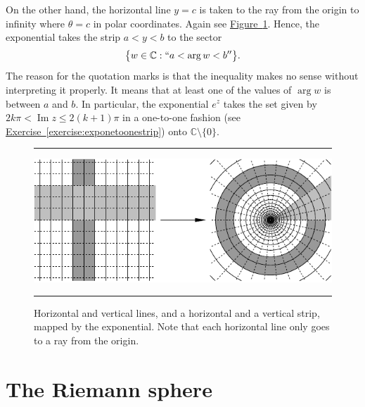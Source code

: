 \documentclass[12pt,openany]{book}
\renewcommand{\Im}{\operatorname{Im}}
\newcommand{\C}{{\mathbb{C}}}
\theoremstyle{plain}
\theoremstyle{remark}
\theoremstyle{definition}
\newenvironment{myfig}{%
\begin{figure}[h!t]
\noindent\rule{\textwidth}{0.5pt}\vspace{12pt}\par\centering}%
{\par\noindent\rule{\textwidth}{0.5pt}
\end{figure}}
\theoremstyle{exercise}
\theoremstyle{example}
\newcommand{\figureref}[1]{\hyperref[#1]{Figure~\ref*{#1}}}
\newcommand{\exerciseref}[1]{\hyperref[#1]{Exercise~\ref*{#1}}}
\begin{document}
On the other hand, the horizontal line $y=c$
is taken to the ray from the origin to infinity where $\theta = c$ in polar
coordinates.  Again see \figureref{fig:expplotlines}.
Hence, the exponential takes the strip $a < y < b$ to the
sector
\begin{equation*}
\bigl\{ w \in \C : ``a < \arg w < b'' \bigr\} .
\end{equation*}
The reason for the quotation marks is that the inequality makes no
sense without interpreting it properly.  It means that at least one of the values
of $\arg w$ is between $a$ and $b$.
In particular, the exponential $e^z$ takes the set given by
$2k\pi < \Im z \leq 2(k+1)\pi$ in a one-to-one fashion
(see \exerciseref{exercise:exponetoonestrip})
onto $\C \setminus \{ 0 \}$.

\begin{myfig}
\includegraphics{figures/expplotlines}
\caption{Horizontal and vertical lines, and a horizontal and a vertical
strip, mapped by the exponential.  Note that
each horizontal line only goes to a ray from the
origin.\label{fig:expplotlines}}
\end{myfig}


\section{The Riemann sphere}
\end{document}
